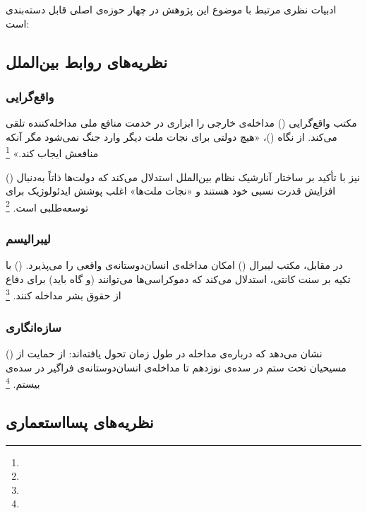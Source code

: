 ادبیات نظری مرتبط با موضوع این پژوهش در چهار حوزه‌ی اصلی قابل دسته‌بندی است:

\subsection{نظریه‌های روابط بین‌الملل}
\label{subsec:ch01-lit-ir}

\subsubsection{واقع‌گرایی}
مکتب واقع‌گرایی () مداخله‌ی خارجی را ابزاری در خدمت منافع ملی مداخله‌کننده تلقی می‌کند. از نگاه  ()، «هیچ دولتی برای نجات ملت دیگر وارد جنگ نمی‌شود مگر آنکه منافعش ایجاب کند.»%
\footnote{}

 () نیز با تأکید بر ساختار آنارشیک نظام بین‌الملل استدلال می‌کند که دولت‌ها ذاتاً به‌دنبال افزایش قدرت نسبی خود هستند و «نجات ملت‌ها» اغلب پوشش ایدئولوژیک برای توسعه‌طلبی است.%
\footnote{}

\subsubsection{لیبرالیسم}
در مقابل، مکتب لیبرال () امکان مداخله‌ی انسان‌دوستانه‌ی واقعی را می‌پذیرد.  () با تکیه بر سنت کانتی، استدلال می‌کند که دموکراسی‌ها می‌توانند (و گاه باید) برای دفاع از حقوق بشر مداخله کنند.%
\footnote{}

\subsubsection{سازه‌انگاری}
 () نشان می‌دهد که  درباره‌ی مداخله در طول زمان تحول یافته‌اند: از حمایت از مسیحیان تحت ستم در سده‌ی نوزدهم تا مداخله‌ی انسان‌دوستانه‌ی فراگیر در سده‌ی بیستم.%
\footnote{}

\subsection{نظریه‌های پسااستعماری}
\label{subsec:ch01-lit-postcolonial}


